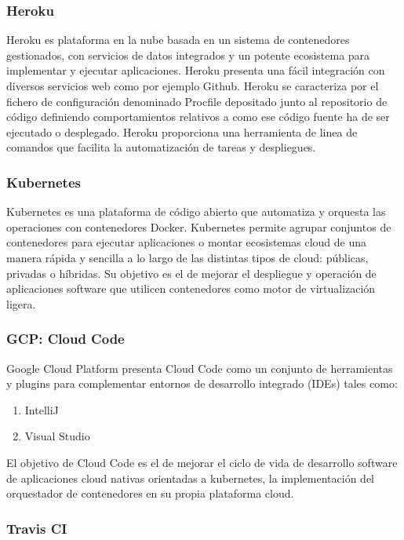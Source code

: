 \documentclass[a4paper,11pt]{book}
\begin{document}
\subsubsection{Heroku}

Heroku es  plataforma en la nube basada en un sistema de contenedores gestionados, con servicios de datos integrados y un potente ecosistema para implementar y ejecutar aplicaciones. Heroku presenta una fácil integración con diversos servicios web como por ejemplo Github. Heroku se caracteriza por el fichero de configuración denominado Procfile depositado junto al repositorio de código definiendo comportamientos relativos a como ese código fuente ha de ser ejecutado o desplegado.  Heroku proporciona una herramienta de linea de comandos que facilita la automatización de tareas y despliegues.

\subsubsection{Kubernetes}
Kubernetes\cite{kube} es una plataforma de código abierto que automatiza y orquesta las operaciones con contenedores Docker. Kubernetes permite agrupar conjuntos de contenedores para ejecutar aplicaciones o montar ecosistemas cloud de una manera rápida y sencilla a lo largo de las distintas tipos de cloud: públicas, privadas o híbridas. Su objetivo es el de mejorar el despliegue y operación de aplicaciones software que utilicen contenedores como motor de virtualización ligera.  

\subsubsection{GCP: Cloud Code}

Google Cloud Platform\cite{gcp} presenta Cloud Code\cite{gcpcode} como un conjunto de herramientas y plugins para complementar entornos de desarrollo integrado (IDEs)  tales como: 

\begin{enumerate}
\item IntelliJ 
\item Visual Studio
\end{enumerate}

El objetivo de Cloud Code es el de mejorar el ciclo de vida de desarrollo software de aplicaciones cloud  nativas orientadas a kubernetes,  la implementación del orquestador de contenedores en su propia plataforma cloud. 

\subsubsection{Travis CI}
\end{document}
